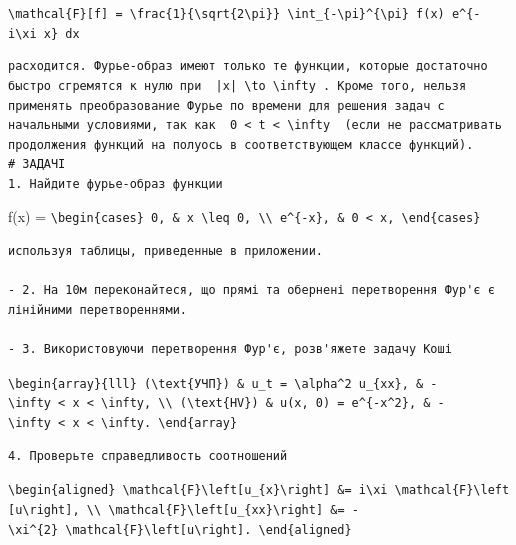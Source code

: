 \documentclass[
  ukrainian,
]{article}
\begin{document}
\texttt{\textbackslash{}mathcal\{F\}{[}f{]}\ =\ \textbackslash{}frac\{1\}\{\textbackslash{}sqrt\{2\textbackslash{}pi\}\}\ \textbackslash{}int\_\{-\textbackslash{}pi\}\^{}\{\textbackslash{}pi\}\ f(x)\ e\^{}\{-i\textbackslash{}xi\ x\}\ dx}

\begin{verbatim}
расходится. Фурье-образ имеют только те функции, которые достаточно быстро сгремятся к нулю при  |x| \to \infty . Кроме того, нельзя применять преобразование Фурье по времени для решения задач с начальными условиями, так как  0 < t < \infty  (если не рассматривать продолжения функций на полуось в соответствующем классе функций).
# ЗАДАЧІ
1. Найдите фурье-образ функции
\end{verbatim}

f(x) =
\texttt{\textbackslash{}begin\{cases\}\ 0,\ \&\ x\ \textbackslash{}leq\ 0,\ \textbackslash{}\textbackslash{}\ e\^{}\{-x\},\ \&\ 0\ \textless{}\ x,\ \textbackslash{}end\{cases\}}

\begin{verbatim}
используя таблицы, приведенные в приложении.

- 2. На 10м переконайтеся, що прямі та обернені перетворення Фур'є є лінійними перетвореннями.

- 3. Використовуючи перетворення Фур'є, розв'яжете задачу Коші
\end{verbatim}

\texttt{\textbackslash{}begin\{array\}\{lll\}\ (\textbackslash{}text\{УЧП\})\ \&\ u\_t\ =\ \textbackslash{}alpha\^{}2\ u\_\{xx\},\ \&\ -\textbackslash{}infty\ \textless{}\ x\ \textless{}\ \textbackslash{}infty,\ \textbackslash{}\textbackslash{}\ (\textbackslash{}text\{HV\})\ \&\ u(x,\ 0)\ =\ e\^{}\{-x\^{}2\},\ \&\ -\textbackslash{}infty\ \textless{}\ x\ \textless{}\ \textbackslash{}infty.\ \textbackslash{}end\{array\}}

\begin{verbatim}
4. Проверьте справедливость соотношений
\end{verbatim}

\texttt{\textbackslash{}begin\{aligned\}\ \textbackslash{}mathcal\{F\}\textbackslash{}left{[}u\_\{x\}\textbackslash{}right{]}\ \&=\ i\textbackslash{}xi\ \textbackslash{}mathcal\{F\}\textbackslash{}left{[}u\textbackslash{}right{]},\ \textbackslash{}\textbackslash{}\ \textbackslash{}mathcal\{F\}\textbackslash{}left{[}u\_\{xx\}\textbackslash{}right{]}\ \&=\ -\textbackslash{}xi\^{}\{2\}\ \textbackslash{}mathcal\{F\}\textbackslash{}left{[}u\textbackslash{}right{]}.\ \textbackslash{}end\{aligned\}}
\end{document}
